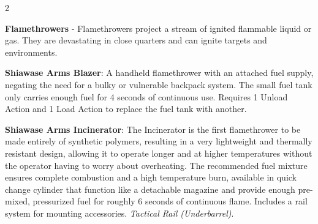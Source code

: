 \documentclass[
  oneside]{article}
\begin{document}
\begin{multicols}{2}

\textbf{Flamethrowers} - Flamethrowers project a
stream of ignited flammable liquid or gas. They
are devastating in close quarters and can ignite
targets and environments.

\textbf{Shiawase Arms Blazer}: A handheld
flamethrower with an attached fuel supply,
negating the need for a bulky or vulnerable
backpack system. The small fuel tank only carries
enough fuel for 4 seconds of continuous use.
Requires 1 Unload Action and 1 Load Action to
replace the fuel tank with another.

\textbf{Shiawase Arms Incinerator}: The
Incinerator is the first flamethrower to be made
entirely of synthetic polymers, resulting in a
very lightweight and thermally resistant design,
allowing it to operate longer and at higher
temperatures without the operator having to worry
about overheating. The recommended fuel mixture
ensures complete combustion and a high temperature
burn, available in quick change cylinder that
function like a detachable magazine and provide
enough pre-mixed, pressurized fuel for roughly 6
seconds of continuous flame. Includes a rail
system for mounting accessories. \emph{Tactical
Rail (Underbarrel)}.

\end{multicols}
\end{document}
